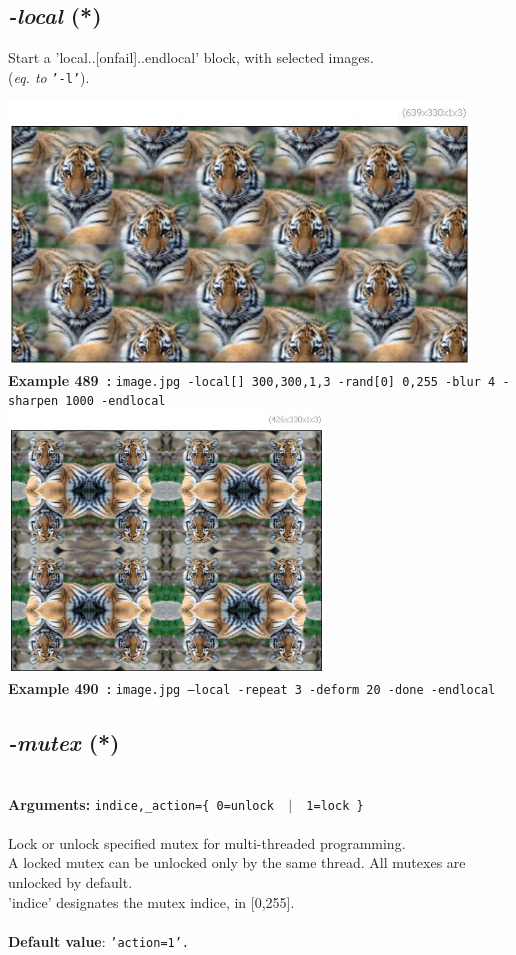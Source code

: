 \documentclass[a4paper,11pt,twoside]{book}
\begin{document}
\subsection{\emph{-local} (*)}\vspace*{-0.5em}
Start a 'local..[onfail]..endlocal' block, with selected images.
~\\(\emph{eq. to} {\small \texttt{'-l'}}).
\begin{center}\includegraphics[keepaspectratio=true,height=7cm,width=\textwidth]{img/gmic_def489.jpg}\\
{\footnotesize \textbf{Example 489~:} \texttt{image.jpg -local[] 300,300,1,3 -rand[0] 0,255 -blur 4 -sharpen 1000 -endlocal}}
\\\includegraphics[keepaspectratio=true,height=7cm,width=\textwidth]{img/gmic_def490.jpg}\\
{\footnotesize \textbf{Example 490~:} \texttt{image.jpg --local -repeat 3 -deform 20 -done -endlocal}}
\end{center}

\subsection{\emph{-mutex} (*)}\vspace*{-0.5em}
~\\\textbf{Arguments: } 
{\small \texttt{indice,\_action=\{ 0=unlock ~$|$~ 1=lock \}}}\\~\\
Lock or unlock specified mutex for multi-threaded programming.
~\\A locked mutex can be unlocked only by the same thread. All mutexes are unlocked by default.
~\\'indice' designates the mutex indice, in [0,255].
~\\~\\\textbf{Default value}: {\small \texttt{'action=1'.}}
\end{document}
